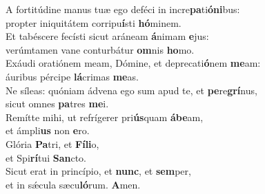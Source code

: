 \evenverse A fortitúdine manus tuæ ego deféci in incre\textbf{pa}ti\textbf{ó}\textbf{ni}bus:~\*\\
\evenverse propter iniquitátem corripu\textbf{í}sti \textbf{hó}minem.\\
\oddverse Et tabéscere fecísti sicut aráneam \textbf{á}nimam \textbf{e}jus:~\*\\
\oddverse verúmtamen vane conturbátur \textbf{om}nis \textbf{ho}mo.\\
\evenverse Exáudi oratiónem meam, Dómine, et deprecati\textbf{ó}nem \textbf{me}am:~\*\\
\evenverse áuribus pércipe \textbf{lá}crimas \textbf{me}as.\\
\oddverse Ne síleas: quóniam ádvena ego sum apud te, et \textbf{pe}re\textbf{grí}nus,~\*\\
\oddverse sicut omnes \textbf{pa}tres \textbf{me}i.\\
\evenverse Remítte mihi, ut refrígerer pri\textbf{ús}quam \textbf{á}\textbf{be}am,~\*\\
\evenverse et ámpli\textbf{us} non \textbf{e}ro.\\
\oddverse Glória \textbf{Pa}tri, et \textbf{Fí}\textbf{li}o,~\*\\
\oddverse et Spi\textbf{rí}tui \textbf{San}cto.\\
\evenverse Sicut erat in princípio, et \textbf{nunc}, et \textbf{sem}per,~\*\\
\evenverse et in sǽcula sæcu\textbf{ló}rum. \textbf{A}men.\\
